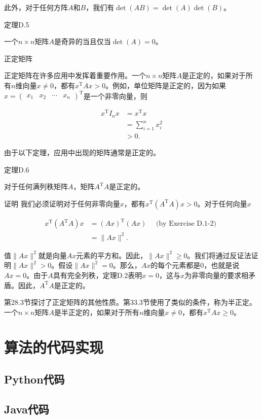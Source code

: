 \documentclass[lang=cn,newtx,10pt,scheme=chinese]{elegantbook}
\begin{document}
此外，对于任何方阵$A$和$B$，我们有$\operatorname{det}(AB)=\operatorname{det}(A) \operatorname{det}(B)$。

定理D.5

一个$n \times n$矩阵$A$是奇异的当且仅当$\operatorname{det}(A)=0$。

正定矩阵

正定矩阵在许多应用中发挥着重要作用。一个$n \times n$矩阵$A$是正定的，如果对于所有$n$维向量$x \neq 0$，都有$x^{\mathrm{T}} A x>0$。例如，单位矩阵是正定的，因为如果$x=\left(\begin{array}{llll}x_1 & x_2 & \cdots & x_n\end{array}\right)^{\mathrm{T}}$是一个非零向量，则

$$
\begin{aligned}
x^{\mathrm{T}} I_n x & =x^{\mathrm{T}} x \\
& =\sum_{i=1}^n x_i^2 \\
& >0 .
\end{aligned}
$$

由于以下定理，应用中出现的矩阵通常是正定的。

定理D.6

对于任何满列秩矩阵$A$，矩阵$A^{\mathrm{T}} A$是正定的。

证明 我们必须证明对于任何非零向量$x$，都有$x^{\mathrm{T}}\left(A^{\mathrm{T}} A\right) x>0$。对于任何向量$x$

$$
\begin{aligned}
x^{\mathrm{T}}\left(A^{\mathrm{T}} A\right) x & =(A x)^{\mathrm{T}}(A x) \quad \text { (by Exercise D.1-2) } \\
& =\|A x\|^2 .
\end{aligned}
$$

值$\|A x\|^2$就是向量$A x$元素的平方和。因此，$\|A x\|^2 \geq 0$。我们将通过反证法证明$\|A x\|^2>0$。假设$\|A x\|^2=0$。那么，$A x$的每个元素都是0，也就是说$A x=0$。由于$A$具有完全列秩，定理D.2表明$x=0$，这与$x$为非零向量的要求相矛盾。因此，$A^{\mathrm{T}} A$是正定的。

第28.3节探讨了正定矩阵的其他性质。第33.3节使用了类似的条件，称为半正定。一个$n \times n$矩阵$A$是半正定的，如果对于所有$n$维向量$x \neq 0$，都有$x^{\mathrm{T}} A x \geq 0$。

\part{算法的代码实现}

\chapter{Python代码}

\chapter{Java代码}
\end{document}
